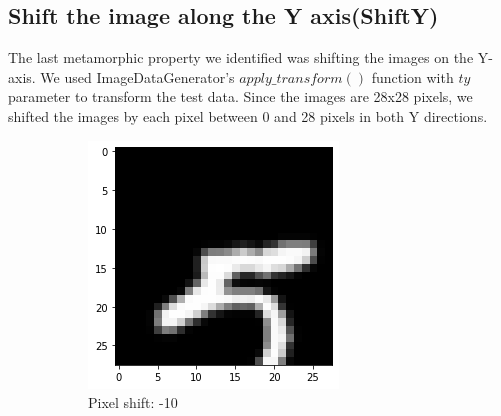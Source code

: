 \subsection{Shift the image along the Y axis(ShiftY)}
The last metamorphic property we identified was shifting the images on the Y-axis. We used ImageDataGenerator's $apply\_transform()$ function with $ty$ parameter to transform the test data. Since the images are 28x28 pixels, we shifted the images by each pixel between 0 and 28 pixels in both Y directions. 
    \begin{figure}[htb!]
        \centering
        \begin{subfigure}[b]{.3\textwidth}
            \centering
            \includegraphics[width=\linewidth]{images/shifty1.png}
            \caption{Pixel shift: -10}
            \label{fig:Rotate-misclass0}
        \end{subfigure}%
        \begin{subfigure}[b]{.3\textwidth}
            \centering

\end{subfigure}
\end{figure}
